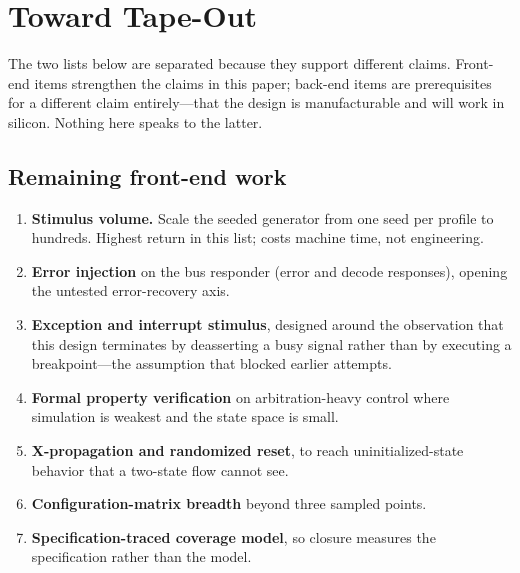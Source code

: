 \documentclass[conference]{IEEEtran}
\begin{document}
\section{Toward Tape-Out}
\label{sec:roadmap}

The two lists below are separated because they support different claims.
Front-end items strengthen the claims in this paper; back-end items are
prerequisites for a different claim entirely---that the design is
manufacturable and will work in silicon. Nothing here speaks to the
latter.

\subsection{Remaining front-end work}
\begin{enumerate}
\item \textbf{Stimulus volume.} Scale the seeded generator from one seed
per profile to hundreds. Highest return in this list; costs machine time,
not engineering.
\item \textbf{Error injection} on the bus responder (error and decode
responses), opening the untested error-recovery axis.
\item \textbf{Exception and interrupt stimulus}, designed around the
observation that this design terminates by deasserting a busy signal
rather than by executing a breakpoint---the assumption that blocked
earlier attempts.
\item \textbf{Formal property verification} on arbitration-heavy control
where simulation is weakest and the state space is small.
\item \textbf{X-propagation and randomized reset}, to reach
uninitialized-state behavior that a two-state flow cannot see.
\item \textbf{Configuration-matrix breadth} beyond three sampled points.
\item \textbf{Specification-traced coverage model}, so closure measures
the specification rather than the model.
\end{enumerate}
\end{document}
